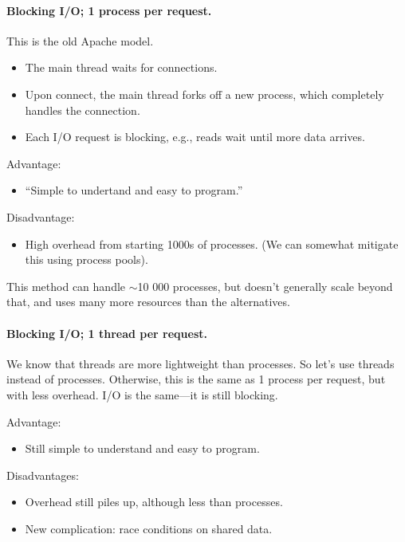 \paragraph{Blocking I/O; 1 process per request.}
This is the old Apache model.
  \begin{itemize}
    \item The main thread waits for connections.
    \item Upon connect, the main thread forks off a new process, which completely
      handles the connection.
    \item Each I/O request is blocking, e.g., reads wait until more data arrives.
  \end{itemize}

Advantage: 
  \begin{itemize}
    \item ``Simple to undertand and easy to program.''
  \end{itemize}

Disadvantage:
  \begin{itemize}
    \item High overhead from starting 1000s of processes.
      (We can somewhat mitigate this using process pools).
  \end{itemize}
This method can handle $\sim$10 000 processes, but doesn't generally scale beyond that, and
uses many more resources than the alternatives.

\paragraph{Blocking I/O; 1 thread per request.}
    We know that threads are more lightweight than processes. So let's use threads instead
of processes. Otherwise, this is the same as 1 process per request, but with less overhead.
I/O is the same---it is still blocking.

    Advantage:
    \begin{itemize}
      \item Still simple to understand and easy to program.
    \end{itemize}

    Disadvantages:
    \begin{itemize}
      \item Overhead still piles up, although less than processes.
      \item New complication: race conditions on shared data.
    \end{itemize}

